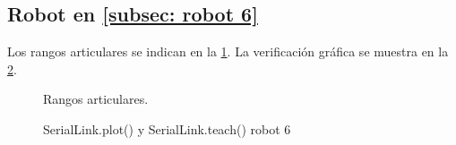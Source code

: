 \documentclass[a4paper,12pt]{article}
\begin{document}
\subsection{Robot en \cref{subsec: robot 6}}
Los rangos articulares se indican en la \cref{rangos kuka}. La verificación gráfica se muestra en la \cref{teach robot 6}.

\begin{figure}[H]
    \centering
    \begin{adjustbox}{scale = 0.8, max width=\columnwidth}
    \end{adjustbox}
    \caption{Rangos articulares.}
    \label{rangos kuka}
\end{figure}

\begin{figure}[H]
    \centering
    \begin{adjustbox}{max width=\columnwidth}
    \end{adjustbox}
    \caption{SerialLink.plot() y SerialLink.teach() robot 6}
    \label{teach robot 6}
\end{figure}
\end{document}
